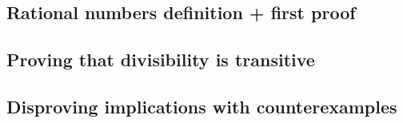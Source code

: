 \documentclass[11pt]{article}
\begin{document}
\subsection{Rational numbers definition + first proof}
\label{sec:orgba65b15}

\subsection{Proving that divisibility is transitive}
\label{sec:org0b8b04d}

\subsection{Disproving implications with counterexamples}
\label{sec:org578032f}

\subsection{}
\label{sec:org0908876}
\end{document}
